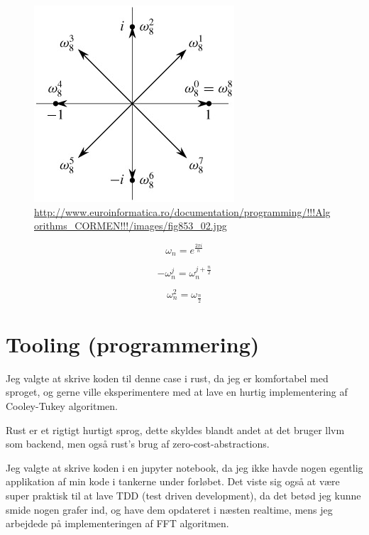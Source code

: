 \documentclass[11pt,a4paper]{article}
\begin{document}
\begin{figure}[htbp]
\centering
\includegraphics[width=.9\linewidth]{./nth_root_of_unity.jpg}
\caption{\url{http://www.euroinformatica.ro/documentation/programming/!!!Algorithms\_CORMEN!!!/images/fig853\_02.jpg}}
\end{figure}

$$
\omega_n = e^{\frac{2\pi i}{n}}
$$

$$
-\omega_n^j = \omega_n^{j+\frac{n}{2}}
$$

$$
\omega_n^2 = \omega_{\frac{n}{2}}
$$


\section{Tooling (programmering)}
\label{sec:org4020591}
Jeg valgte at skrive koden til denne case i rust, da jeg er komfortabel med sproget,
og gerne ville eksperimentere med at lave en hurtig implementering af Cooley-Tukey algoritmen.

Rust er et rigtigt hurtigt sprog, dette skyldes blandt andet at det bruger llvm som backend,
men også rust's brug af zero-cost-abstractions.

Jeg valgte at skrive koden i en jupyter notebook, da jeg ikke havde nogen egentlig
applikation af min kode i tankerne under forløbet.
Det viste sig også at være super praktisk til at lave TDD (test driven development),
da det betød jeg kunne smide nogen grafer ind, og have dem opdateret i næsten realtime,
mens jeg arbejdede på implementeringen af FFT algoritmen.
\end{document}
